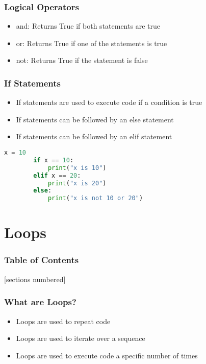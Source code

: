 \documentclass[serif, 9pt, aspectratio=32]{beamer}
\begin{document}
\begin{frame}
    \centering
    \frametitle{Logical Operators}
    \begin{itemize}
        \setlength{\itemsep}{3em}
        \item and: Returns True if both statements are true
        \item or: Returns True if one of the statements is true
        \item not: Returns True if the statement is false
    \end{itemize}
\end{frame}

\begin{frame}
    \centering
    \frametitle{If Statements}
    \begin{itemize}
        \setlength{\itemsep}{3em}
        \item If statements are used to execute code if a condition is true
        \item If statements can be followed by an else statement
        \item If statements can be followed by an elif statement
    \end{itemize}
\end{frame}

\begin{frame}[fragile]
    \begin{lstlisting}[language=Python]
        x = 10
        if x == 10:
            print("x is 10")
        elif x == 20:
            print("x is 20")
        else:
            print("x is not 10 or 20")
    \end{lstlisting}
\end{frame}

\section{Loops}

\begin{frame}
    \frametitle{Table of Contents}
    [sections numbered]
    \tableofcontents[currentsection]
\end{frame}

\begin{frame}
    \centering
    \frametitle{What are Loops?}
    \begin{itemize}
        \setlength{\itemsep}{3em}
        \item Loops are used to repeat code
        \item Loops are used to iterate over a sequence
        \item Loops are used to execute code a specific number of times
    \end{itemize}
\end{frame}
\end{document}
